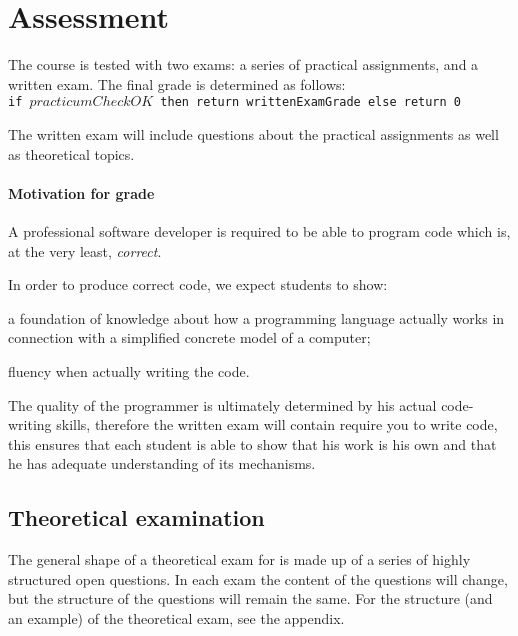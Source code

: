 \section{Assessment}
The course is tested with two exams:
a series of practical assignments,
and a written exam. The final grade is determined as follows: \\

\texttt{if $practicumCheckOK$ then return writtenExamGrade else return 0}

The written exam will include questions about the practical assignments as well as theoretical topics.


\paragraph*{Motivation for grade}
A professional software developer is required to be able to program code which is, at the very least, \textit{correct}.

In order to produce correct code, we expect students to show:
\begin{inparaenum}
\item a foundation of knowledge about how a programming language actually works in connection with a simplified concrete model of a computer;
\item fluency when actually writing the code.
\end{inparaenum}

The quality of the programmer is ultimately determined by his actual code-writing skills, therefore the written exam will contain require you to write code, this ensures that each student is able to show that his work is his own and that he has adequate understanding of its mechanisms.



\subsection{Theoretical examination \modulecode}
The general shape of a theoretical exam for \texttt{\modulecode} is made up of a series of highly structured open questions.
In each exam the content of the questions will change, but the structure of the questions will remain the same.
For the structure (and an example) of the theoretical exam, see the appendix.


